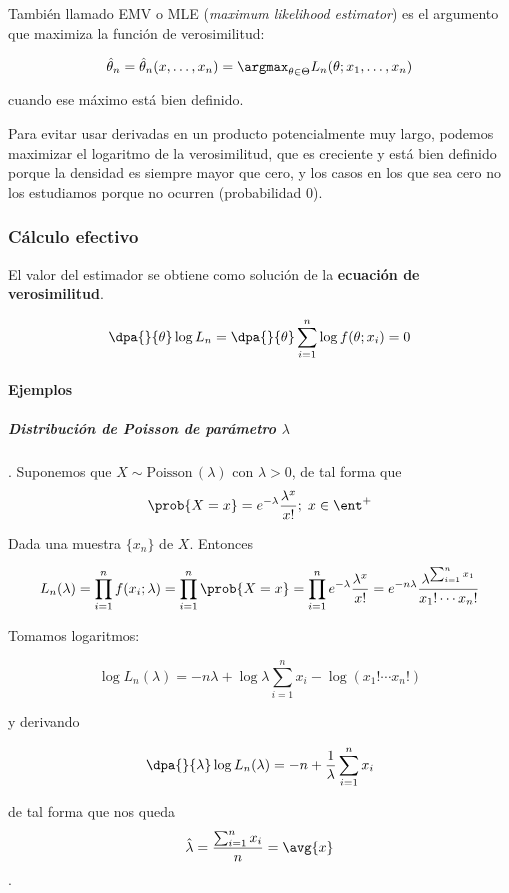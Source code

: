 \documentclass{apuntes}
\begin{document}
\begin{defn} También llamado EMV o MLE (\textit{maximum likelihood estimator}) es el argumento que maximiza la función de verosimilitud:

\[ \hat{\theta}_n = \hat{\theta}_n(x,\dotsc,x_n) = \argmax_{\theta\in\Theta} L_n(\theta;x_1,\dotsc,x_n) \]

cuando ese máximo está bien definido.
\end{defn}

Para evitar usar derivadas en un producto potencialmente muy largo, podemos maximizar el logaritmo de la verosimilitud, que es creciente y está bien definido porque la densidad es siempre mayor que cero, y los casos en los que sea cero no los estudiamos porque no ocurren (probabilidad 0).

\subsubsection{Cálculo efectivo}

El valor del estimador se obtiene como solución de la  \textbf{ecuación de verosimilitud}.

\[ \dpa{}{\theta}\log L_n = \dpa{}{\theta}\sum_{i=1}^n\log f(\theta;x_i) = 0 \]

\paragraph{Ejemplos}

\subparagraph{Distribución de Poisson de parámetro $\lambda$}. Suponemos que $X\sim \text{Poisson}\,(\lambda)$ con $\lambda > 0$, de tal forma que
\label{ejEmvPoisson}
\[ \prob{X = x} = e ^{-\lambda}\frac{\lambda^x}{x!}; \; x\in \ent^+ \]

Dada una muestra $\{x_n\}$ de $X$. Entonces

\[ L_n(\lambda) = \prod_{i=1}^n f(x_i;\lambda) = \prod_{i=1}^n \prob{X=x} = \prod_{i=1}^n e ^{-\lambda}\frac{\lambda^x}{x!} = e^{-n\lambda}\frac{\lambda^{\sum_{i=1}^nx_1}}{x_1!\dotsb x_n!} \]

Tomamos logaritmos:

\[ \log  L_n(\lambda) = -n\lambda + \log\lambda \sum_{i=1}^n x_i- \log\left(x_1!\dotsb x_n!\right) \]

y derivando

\[ \dpa{}{\lambda}\log  L_n(\lambda)  = -n +\frac{1}{\lambda} \sum_{i=1}^n x_i \]

de tal forma que nos queda \[ \hat{\lambda} = \frac{\sum_{i=1}^n x_i}{n} = \avg{x} \].
\end{document}
